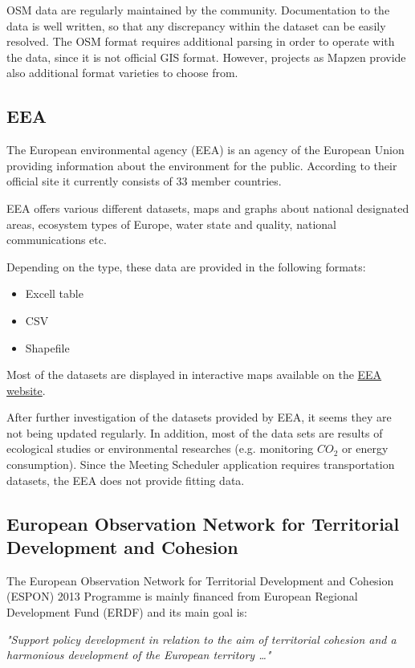 \documentclass[thesis=M,english]{FITthesis}[2012/10/20]
\begin{document}
OSM data are regularly maintained by the community. Documentation to the data is well written, so that any discrepancy within the dataset can be easily resolved. The OSM format requires additional parsing in order to operate with the data, since it is not official GIS format. However, projects as Mapzen provide also additional format varieties to choose from.

\subsection{EEA}
The European environmental agency (EEA) is an agency of the European Union providing information about the environment for the public. According to their official site \cite{EEA16} it currently consists of 33 member countries.

EEA offers various different datasets, maps and graphs about national designated areas, ecosystem types of Europe, water state and quality, national communications etc. 

Depending on the type, these data are provided in the following formats:
\begin{itemize}
\item Excell table
\item CSV
\item Shapefile
\end{itemize} 

Most of the datasets are displayed in interactive maps available on the \href{http://www.eea.europa.eu/data-and-maps}{EEA website}.

After further investigation of the datasets provided by EEA, it seems they are not being updated regularly. In addition, most of the data sets are results of ecological studies or environmental researches (e.g. monitoring $CO_{2}$ or energy consumption). Since the Meeting Scheduler application requires transportation datasets, the EEA does not provide fitting data.

\subsection{European Observation Network for Territorial Development and Cohesion}
The European Observation Network for Territorial Development and Cohesion (ESPON) 2013 Programme is mainly financed from European Regional Development Fund (ERDF) and its main goal is:

\textit{"Support policy development in relation to the aim of territorial cohesion and a harmonious development of the European territory \ldots "} \cite{ESPON13}
\end{document}
